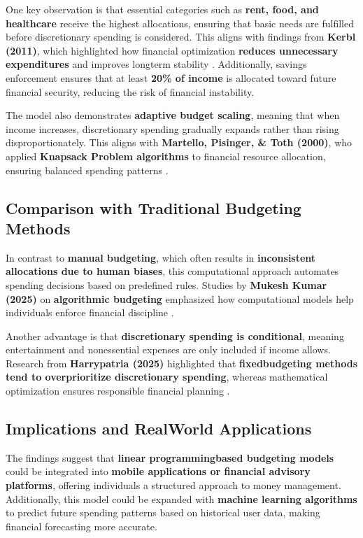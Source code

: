 \documentclass{article}
\begin{document}
One key observation is that essential categories such as \textbf{rent, food, and healthcare} receive the highest allocations, ensuring that basic needs are fulfilled before discretionary spending is considered. This aligns with findings from \textbf{Kerbl (2011)}, which highlighted how financial optimization \textbf{reduces unnecessary expenditures} and improves longterm stability \cite{kerbl2011optimization}. Additionally, savings enforcement ensures that at least \textbf{20\% of income} is allocated toward future financial security, reducing the risk of financial instability.

The model also demonstrates \textbf{adaptive budget scaling}, meaning that when income increases, discretionary spending gradually expands rather than rising disproportionately. This aligns with \textbf{Martello, Pisinger, \& Toth (2000)}, who applied \textbf{Knapsack Problem algorithms} to financial resource allocation, ensuring balanced spending patterns \cite{martello2000knapsack}.

\subsection{Comparison with Traditional Budgeting Methods}
In contrast to \textbf{manual budgeting}, which often results in \textbf{inconsistent allocations due to human biases}, this computational approach automates spending decisions based on predefined rules. Studies by \textbf{Mukesh Kumar (2025)} on \textbf{algorithmic budgeting} emphasized how computational models help individuals enforce financial discipline \cite{upgrad2025knapsack}.

Another advantage is that \textbf{discretionary spending is conditional}, meaning entertainment and nonessential expenses are only included if income allows. Research from \textbf{Harrypatria (2025)} highlighted that \textbf{fixedbudgeting methods tend to overprioritize discretionary spending}, whereas mathematical optimization ensures responsible financial planning \cite{harrypatria2025pulp}.

\subsection{Implications and RealWorld Applications}
The findings suggest that \textbf{linear programmingbased budgeting models} could be integrated into \textbf{mobile applications or financial advisory platforms}, offering individuals a structured approach to money management. Additionally, this model could be expanded with \textbf{machine learning algorithms} to predict future spending patterns based on historical user data, making financial forecasting more accurate.
\end{document}
